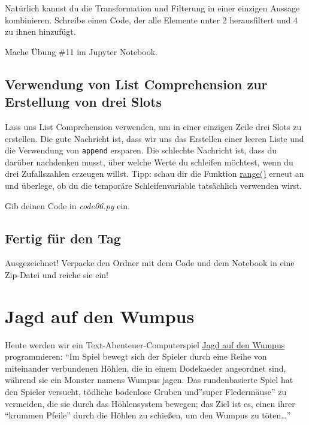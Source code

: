 \documentclass[
]{book}
\begin{document}
Natürlich kannst du die Transformation und Filterung in einer einzigen Aussage kombinieren. Schreibe einen Code, der alle Elemente unter 2 herausfiltert und 4 zu ihnen hinzufügt.

Mache Übung \#11 im Jupyter Notebook.

\hypertarget{verwendung-von-list-comprehension-zur-erstellung-von-drei-slots}{%
\section{Verwendung von List Comprehension zur Erstellung von drei Slots}\label{verwendung-von-list-comprehension-zur-erstellung-von-drei-slots}}

Lass uns List Comprehension verwenden, um in einer einzigen Zeile drei Slots zu erstellen. Die gute Nachricht ist, dass wir uns das Erstellen einer leeren Liste und die Verwendung von \texttt{append} ersparen. Die schlechte Nachricht ist, dass du darüber nachdenken musst, über welche Werte du schleifen möchtest, wenn du drei Zufallszahlen erzeugen willst. Tipp: schau dir die Funktion \protect\hyperlink{range}{range()} erneut an und überlege, ob du die temporäre Schleifenvariable tatsächlich verwenden wirst.

Gib deinen Code in \emph{code06.py} ein.

\hypertarget{fertig-fuxfcr-den-tag}{%
\section{Fertig für den Tag}\label{fertig-fuxfcr-den-tag}}

Ausgezeichnet! Verpacke den Ordner mit dem Code und dem Notebook in eine Zip-Datei und reiche sie ein!

\hypertarget{hunt-the-wumpus}{%
\chapter{Jagd auf den Wumpus}\label{hunt-the-wumpus}}

Heute werden wir ein Text-Abenteuer-Computerspiel \href{https://en.wikipedia.org/wiki/Hunt_the_Wumpus}{Jagd auf den Wumpus} programmieren: ``Im Spiel bewegt sich der Spieler durch eine Reihe von miteinander verbundenen Höhlen, die in einem Dodekaeder angeordnet sind, während sie ein Monster namens Wumpus jagen. Das rundenbasierte Spiel hat den Spieler versucht, tödliche bodenlose Gruben und''super Fledermäuse'' zu vermeiden, die sie durch das Höhlensystem bewegen; das Ziel ist es, einen ihrer ``krummen Pfeile'' durch die Höhlen zu schießen, um den Wumpus zu töten\ldots''
\end{document}
